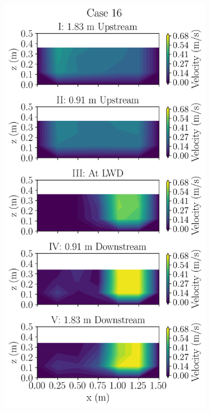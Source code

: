 \documentclass[preview, border=2pt]{standalone}
\begin{document}
\begin{figure}
\begin{subfigure}[b]{0.24\textwidth}
     \end{subfigure}
     \hfill     
     \begin{subfigure}[b]{0.24\textwidth}
         \centering
         \caption{}
         \includegraphics[width=\textwidth]{Case16_velocity_contours.png}
     \end{subfigure}
\end{figure}
\end{document}
